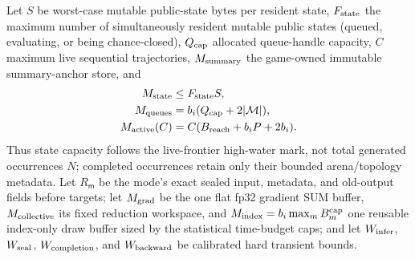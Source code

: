 \documentclass[10pt,a4paper]{article}
\begin{document}
Let $S$ be worst-case mutable public-state bytes per resident state,
$F_{\rm state}$ the maximum number of simultaneously resident mutable public
states (queued, evaluating, or being chance-closed), $Q_{\rm cap}$ allocated
queue-handle capacity, $C$ maximum live sequential trajectories,
$M_{\rm summary}$ the game-owned immutable summary-anchor store, and
\begin{align*}
 M_{\rm state}&\leq F_{\rm state}S,\\
 M_{\rm queues}&=b_i(Q_{\rm cap}+2|\mathcal M|),\\
 M_{\rm active}(C)&=C(B_{\rm reach}+b_iP+2b_i).
\end{align*}
Thus state capacity follows the live-frontier high-water mark, not total
generated occurrences $N$; completed occurrences retain only their bounded
arena/topology metadata.  Let $R_{\mathsf m}$ be the mode's exact sealed
input, metadata, and old-output fields before targets; let $M_{\rm grad}$ be
the one flat fp32 gradient SUM buffer, $M_{\rm collective}$ its fixed reduction
workspace, and $M_{\rm index}=b_i\max_m B_m^{\rm cap}$ one reusable index-only
draw buffer sized by the statistical time-budget caps; and let
$W_{\rm infer}$, $W_{\rm seal}$, $W_{\rm completion}$, and
$W_{\rm backward}$ be calibrated hard transient bounds.
\end{document}
